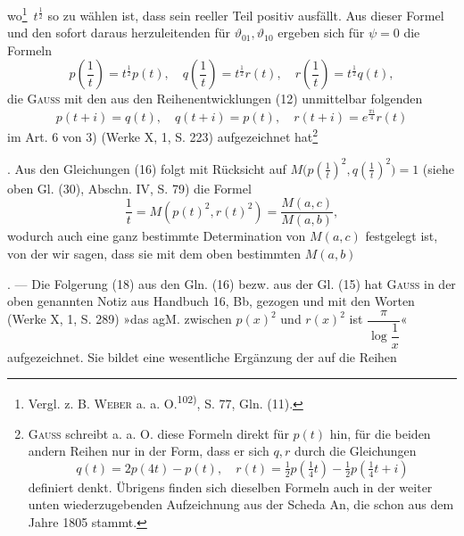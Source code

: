 \endgroup
\noindent wo\footnote{Vergl. z. B. \textsc{Weber} a. a. O.\textsuperscript{102)}, S. 77, Gln. (11).}\ \(t^{\frac12}\) so zu wählen ist, dass sein reeller Teil positiv ausfällt. Aus dieser
Formel und den sofort daraus herzuleitenden für \(\vartheta_{01},\vartheta_{10}\) ergeben sich für
\(\psi=0\) die Formeln
\begingroup\makeatletter\tagsleft@true\let\veqno\leqno\makeatother
\begin{equation*}
p\left(\frac1t\right)=t^{\frac12}p(t),\quad q\left(\frac1t\right)=t^{\frac12}r(t),\quad r\left(\frac1t\right)=t^{\frac12}q(t),\tag{16}
\end{equation*}
\endgroup
\noindent die \textsc{Gauss} mit den aus den Reihenentwicklungen (12) unmittelbar folgenden
\begingroup\makeatletter\tagsleft@true\let\veqno\leqno\makeatother
\begin{equation*}
p(t+i)=q(t),\quad q(t+i)=p(t),\quad r(t+i)=e^{\frac{\pi i}4}r(t)\tag{17}
\end{equation*}
\endgroup
\noindent im Art. 6 von 3) (Werke X, 1, S. 223) aufgezeichnet hat\begingroup\renewcommand{\thefootnote}{131a)}\footnote{\textsc{Gauss} schreibt a. a. O. diese Formeln direkt für \(p(t)\) hin, für die beiden andern Reihen nur in der Form, dass er sich \(q,r\) durch die Gleichungen
\[
q(t)=2p(4t)-p(t),\quad r(t)=\tfrac12p(\tfrac14t)-\tfrac12p(\tfrac14t+i)
\]
definiert denkt. Übrigens finden sich dieselben Formeln auch in der weiter unten wiederzugebenden Aufzeichnung aus der Scheda An, die schon aus dem Jahre 1805 stammt.}\endgroup\addtocounter{footnote}{-1}. Aus den Gleichungen
(16) folgt mit Rücksicht auf \(M\bigl(p(\tfrac1t)^2,q(\tfrac1t)^2\bigr)=1\) (siehe oben Gl.
(30), Abschn. IV, S. 79) die Formel
\begingroup\makeatletter\tagsleft@true\let\veqno\leqno\makeatother
\begin{equation*}
\frac1t=M(p(t)^2,r(t)^2)=\frac{M(a,c)}{M(a,b)},\tag{18}
\end{equation*}
\endgroup
\noindent wodurch auch eine ganz bestimmte Determination von \(M(a,c)\) festgelegt ist,
von der wir sagen, dass sie mit dem oben bestimmten \(M(a,b)\) \par
\clearpage{}
\noindent{}. — Die Folgerung (18) aus den Gln. (16) bezw. aus der Gl. (15) hat
\textsc{Gauss} in der oben genannten Notiz aus Handbuch 16, Bb, gezogen und mit
den Worten (Werke X, 1, S. 289) »das agM. zwischen \(p(x)^2\) und \(r(x)^2\) ist \(\dfrac\pi{\log\dfrac1x}\)«
aufgezeichnet. Sie bildet eine wesentliche Ergänzung der auf die Reihen
